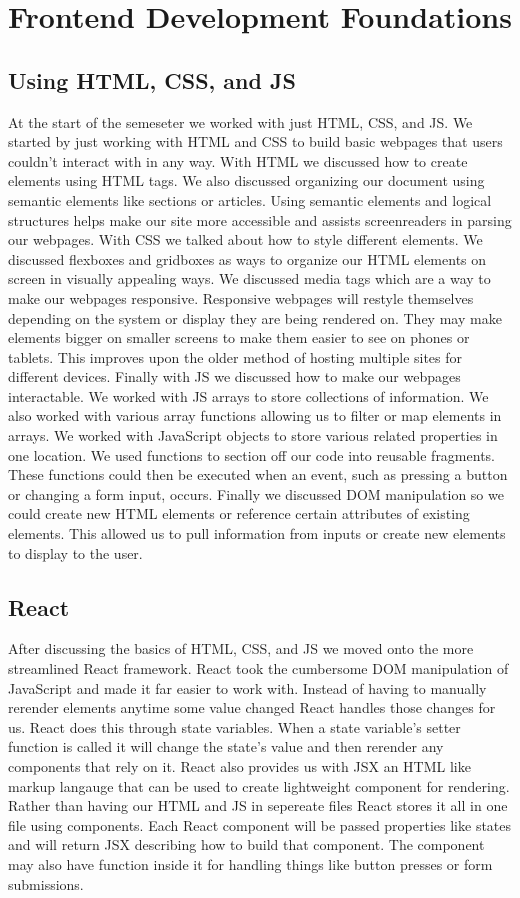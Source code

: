 \documentclass{article}[12pt]
\begin{document}
    \section{Frontend Development Foundations}
    \subsection{Using HTML, CSS, and JS}
    At the start of the semeseter we worked with just HTML, CSS, and JS. We started by just working with HTML and CSS to build basic webpages that users couldn't interact with in any way. With HTML we discussed how to create elements using HTML tags. We also discussed organizing our document using semantic elements like sections or articles. Using semantic elements and logical structures helps make our site more accessible and assists screenreaders in parsing our webpages. With CSS we talked about how to style different elements. We discussed flexboxes and gridboxes as ways to organize our HTML elements on screen in visually appealing ways. We discussed media tags which are a way to make our webpages responsive. Responsive webpages will restyle themselves depending on the system or display they are being rendered on. They may make elements bigger on smaller screens to make them easier to see on phones or tablets. This improves upon the older method of hosting multiple sites for different devices. Finally with JS we discussed how to make our webpages interactable. We worked with JS arrays to store collections of information. We also worked with various array functions allowing us to filter or map elements in arrays. We worked with JavaScript objects to store various related properties in one location. We used functions to section off our code into reusable fragments. These functions could then be executed when an event, such as pressing a button or changing a form input, occurs. Finally we discussed DOM manipulation so we could create new HTML elements or reference certain attributes of existing elements. This allowed us to pull information from inputs or create new elements to display to the user.
    
    \subsection{React}
    After discussing the basics of HTML, CSS, and JS we moved onto the more streamlined React framework. React took the cumbersome DOM manipulation of JavaScript and made it far easier to work with. Instead of having to manually rerender elements anytime some value changed React handles those changes for us. React does this through state variables. When a state variable's setter function is called it will change the state's value and then rerender any components that rely on it. React also provides us with JSX an HTML like markup langauge that can be used to create lightweight component for rendering. Rather than having our HTML and JS in sepereate files React stores it all in one file using components. Each React component will be passed properties like states and will return JSX describing how to build that component. The component may also have function inside it for handling things like button presses or form submissions.
    
\end{document}
